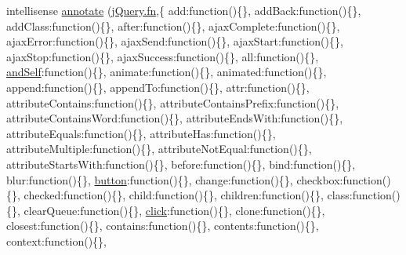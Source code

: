 \begin{DoxyCompactItemize}
\item 
intellisense \hyperlink{jquery-1_810_82_8intellisense_8js_abcf3dc0ac27677031e769f329e49d75a}{annotate} (\hyperlink{_scripts_2jquery-1_810_82_8min_8js_a37b9e1ceee4c6d2616fa6081784b5468}{j\+Query.\+fn},\{ \textquotesingle{}add\textquotesingle{}\+:function()\{\}, \textquotesingle{}add\+Back\textquotesingle{}\+:function()\{\}, \textquotesingle{}add\+Class\textquotesingle{}\+:function()\{\}, \textquotesingle{}after\textquotesingle{}\+:function()\{\}, \textquotesingle{}ajax\+Complete\textquotesingle{}\+:function()\{\}, \textquotesingle{}ajax\+Error\textquotesingle{}\+:function()\{\}, \textquotesingle{}ajax\+Send\textquotesingle{}\+:function()\{\}, \textquotesingle{}ajax\+Start\textquotesingle{}\+:function()\{\}, \textquotesingle{}ajax\+Stop\textquotesingle{}\+:function()\{\}, \textquotesingle{}ajax\+Success\textquotesingle{}\+:function()\{\}, \textquotesingle{}all\textquotesingle{}\+:function()\{\}, \textquotesingle{}\hyperlink{_scripts_2jquery-1_810_82_8js_a63df20b949f6e6fc37d300a41fd9c02b}{and\+Self}\textquotesingle{}\+:function()\{\}, \textquotesingle{}animate\textquotesingle{}\+:function()\{\}, \textquotesingle{}animated\textquotesingle{}\+:function()\{\}, \textquotesingle{}append\textquotesingle{}\+:function()\{\}, \textquotesingle{}append\+To\textquotesingle{}\+:function()\{\}, \textquotesingle{}attr\textquotesingle{}\+:function()\{\}, \textquotesingle{}attribute\+Contains\textquotesingle{}\+:function()\{\}, \textquotesingle{}attribute\+Contains\+Prefix\textquotesingle{}\+:function()\{\}, \textquotesingle{}attribute\+Contains\+Word\textquotesingle{}\+:function()\{\}, \textquotesingle{}attribute\+Ends\+With\textquotesingle{}\+:function()\{\}, \textquotesingle{}attribute\+Equals\textquotesingle{}\+:function()\{\}, \textquotesingle{}attribute\+Has\textquotesingle{}\+:function()\{\}, \textquotesingle{}attribute\+Multiple\textquotesingle{}\+:function()\{\}, \textquotesingle{}attribute\+Not\+Equal\textquotesingle{}\+:function()\{\}, \textquotesingle{}attribute\+Starts\+With\textquotesingle{}\+:function()\{\}, \textquotesingle{}before\textquotesingle{}\+:function()\{\}, \textquotesingle{}bind\textquotesingle{}\+:function()\{\}, \textquotesingle{}blur\textquotesingle{}\+:function()\{\}, \textquotesingle{}\hyperlink{_scripts_2bootstrap_8min_8js_a55e170814e74f6c3db8ae9ea3ba9054f}{button}\textquotesingle{}\+:function()\{\}, \textquotesingle{}change\textquotesingle{}\+:function()\{\}, \textquotesingle{}checkbox\textquotesingle{}\+:function()\{\}, \textquotesingle{}checked\textquotesingle{}\+:function()\{\}, \textquotesingle{}child\textquotesingle{}\+:function()\{\}, \textquotesingle{}children\textquotesingle{}\+:function()\{\}, \textquotesingle{}class\textquotesingle{}\+:function()\{\}, \textquotesingle{}clear\+Queue\textquotesingle{}\+:function()\{\}, \textquotesingle{}\hyperlink{login_8js_a2c7f8b6219185f8af7ec9cece8bc41e3}{click}\textquotesingle{}\+:function()\{\}, \textquotesingle{}clone\textquotesingle{}\+:function()\{\}, \textquotesingle{}closest\textquotesingle{}\+:function()\{\}, \textquotesingle{}contains\textquotesingle{}\+:function()\{\}, \textquotesingle{}contents\textquotesingle{}\+:function()\{\}, \textquotesingle{}context\textquotesingle{}\+:function()\{\}, 
\end{DoxyCompactItemize}
